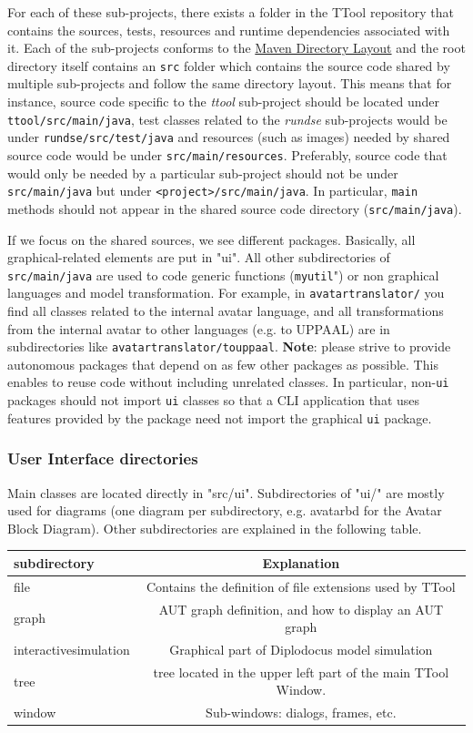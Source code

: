 \documentclass[12pt]{article}
\begin{document}
For each of these sub-projects, there exists a folder in the TTool repository
that contains the sources, tests, resources and runtime dependencies associated
with it. Each of the sub-projects conforms to the
\href{https://maven.apache.org/guides/introduction/introduction-to-the-standard-directory-layout.html}
{Maven Directory Layout} and the root directory itself contains an \texttt{src}
folder which contains the source code shared by multiple sub-projects and
follow the same directory layout. This means that for instance, source code
specific to the \textit{ttool} sub-project should be located under
\texttt{ttool/src/main/java}, test classes related to the \textit{rundse}
sub-projects would be under \texttt{rundse/src/test/java} and resources (such as
images) needed by shared source code would be under \texttt{src/main/resources}.
Preferably, source code that would only be needed by a particular sub-project
should not be under \texttt{src/main/java} but under
\texttt{<project>/src/main/java}. In particular, \texttt{main} methods should
not appear in the shared source code directory (\texttt{src/main/java}).

If we focus on the shared sources, we see different packages. Basically, all
graphical-related elements are put in "ui". All other subdirectories of
\texttt{src/main/java}
are used to code generic functions (\texttt{myutil}") or non graphical languages and
model transformation. For example, in \texttt{avatartranslator/} you find all classes
related to the internal avatar language, and all transformations from the
internal avatar to other languages (e.g. to UPPAAL) are in subdirectories like
\texttt{avatartranslator/touppaal}. \textbf{Note}: please strive to provide
autonomous packages that depend on as few other packages as possible. This
enables to reuse code without including unrelated classes. In particular,
non-\texttt{ui} packages should not import \texttt{ui} classes so that a CLI
application that uses features provided by the package need not import the
graphical \texttt{ui} package.

\subsubsection{User Interface directories}
Main classes are located directly in "src/ui". Subdirectories of "ui/" are mostly used for diagrams (one diagram per subdirectory, e.g. avatarbd for the Avatar Block Diagram). Other subdirectories are explained in the following table.
\begin{tabular}{l|c}
subdirectory&Explanation\\
\hline
file&Contains the definition of file extensions used by TTool\\
graph&AUT graph definition, and how to display an AUT graph\\
interactivesimulation&Graphical part of Diplodocus model simulation\\
tree&tree located in the upper left part of the main TTool Window.\\
window&Sub-windows: dialogs, frames, etc.
\end{tabular}
\end{document}
